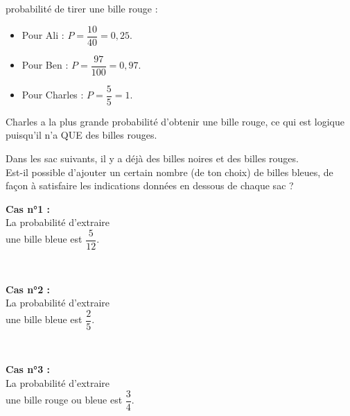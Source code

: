 \begin{colonne*exercice}
\begin{corrige}
   probabilité de tirer une bille rouge :
   \begin{itemize}
      \item Pour Ali : $P =\dfrac{10}{40} =0,25$. \smallskip
      \item Pour Ben : $P =\dfrac{97}{100} =0,97$. \smallskip
      \item Pour Charles : $P =\dfrac{5}{5} =1$. \smallskip
   \end{itemize}
  {\blue Charles a la plus grande probabilité d'obtenir une bille rouge}, ce qui est logique puisqu'il n'a QUE des billes rouges. \\
\end{corrige}

\bigskip


\begin{exercice} %
   Dans les sac suivants, il y a déjà des billes noires et des billes rouges. \\
   Est-il possible d’ajouter un certain nombre (de ton choix) de billes bleues, de façon à satisfaire les indications données en dessous de chaque sac ? \\ [1mm]
   \begin{minipage}{2.5cm} %
   \end{minipage}
   \begin{minipage}{5.5cm}
      {\bf Cas n°1 :} \\
      La probabilité d'extraire \\ une bille bleue est $\dfrac{5}{12}$.
   \end{minipage} \\
   \begin{minipage}{2.5cm} %
   \end{minipage}
   \begin{minipage}{5.5cm}
      {\bf Cas n°2 :} \\
      La probabilité d'extraire \\
      une bille bleue est $\dfrac{2}{5}$.
   \end{minipage} \\
   \begin{minipage}{2.5cm} %
   \end{minipage}
   \begin{minipage}{5.5cm}
      {\bf Cas n°3 :} \\
      La probabilité d'extraire \\
      une bille rouge ou bleue est $\dfrac{3}{4}$.
   \end{minipage}
\end{exercice}


\end{colonne*exercice}
